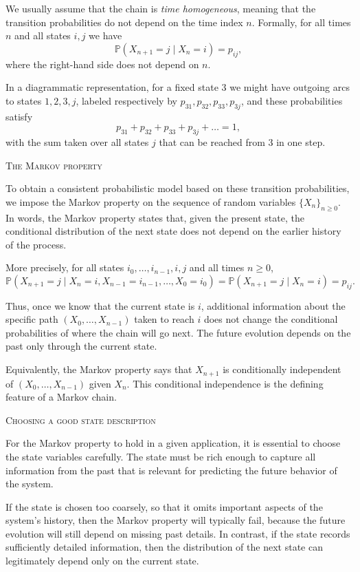 We usually assume that the chain is \textit{time homogeneous}, meaning that the transition probabilities do not depend on the time index \(n\).
Formally, for all times \(n\) and all states \(i,j\) we have
\[
\mathbb{P}(X_{n+1} = j \mid X_n = i)
=
p_{ij},
\]
where the right-hand side does not depend on \(n\).

In a diagrammatic representation, for a fixed state \(3\) we might have outgoing arcs to states \(1,2,3,j\), labeled respectively by \(p_{31}, p_{32}, p_{33}, p_{3j}\), and these probabilities satisfy
\[
p_{31} + p_{32} + p_{33} + p_{3j} + \dots = 1,
\]
with the sum taken over all states \(j\) that can be reached from \(3\) in one step.

\bigskip
\textsc{The Markov property}

To obtain a consistent probabilistic model based on these transition probabilities, we impose the Markov property on the sequence of random variables \(\{X_n\}_{n \ge 0}\).
In words, the Markov property states that, given the present state, the conditional distribution of the next state does not depend on the earlier history of the process.

More precisely, for all states \(i_0,\dots,i_{n-1},i,j\) and all times \(n \ge 0\),
\[
\mathbb{P}(X_{n+1} = j \mid X_n = i, X_{n-1} = i_{n-1}, \dots, X_0 = i_0)
=
\mathbb{P}(X_{n+1} = j \mid X_n = i)
=
p_{ij}.
\]

Thus, once we know that the current state is \(i\), additional information about the specific path \((X_0,\dots,X_{n-1})\) taken to reach \(i\) does not change the conditional probabilities of where the chain will go next.
The future evolution depends on the past only through the current state.

Equivalently, the Markov property says that \(X_{n+1}\) is conditionally independent of \((X_0,\dots,X_{n-1})\) given \(X_n\).
This conditional independence is the defining feature of a Markov chain.

\bigskip
\textsc{Choosing a good state description}

For the Markov property to hold in a given application, it is essential to choose the state variables carefully.
The state must be rich enough to capture all information from the past that is relevant for predicting the future behavior of the system.

If the state is chosen too coarsely, so that it omits important aspects of the system's history, then the Markov property will typically fail, because the future evolution will still depend on missing past details.
In contrast, if the state records sufficiently detailed information, then the distribution of the next state can legitimately depend only on the current state.

